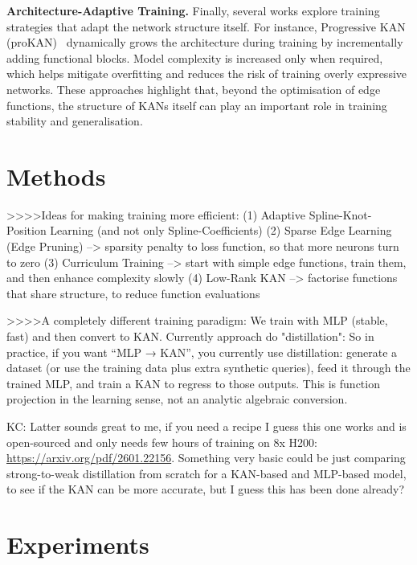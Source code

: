 \documentclass{article}
\begin{document}
\textbf{Architecture-Adaptive Training.}
Finally, several works explore training strategies that adapt the network structure itself.
For instance, Progressive KAN (proKAN)~\cite{gyanchandani2024prokan} dynamically grows the architecture during training by incrementally adding functional blocks.
Model complexity is increased only when required, which helps mitigate overfitting and reduces the risk of training overly expressive networks.
These approaches highlight that, beyond the optimisation of edge functions, the structure of KANs itself can play an important role in training stability and generalisation.
        
\newpage
\fi

\section{Methods}

>>>>Ideas for making training more efficient:
(1) Adaptive Spline-Knot-Position Learning (and not only Spline-Coefficients)
(2) Sparse Edge Learning (Edge Pruning) --> sparsity penalty to loss function, so that more neurons turn to zero
(3) Curriculum Training --> start with simple edge functions, train them, and then enhance complexity slowly
(4) Low-Rank KAN --> factorise functions that share structure, to reduce function evaluations

>>>>A completely different training paradigm:
We train with MLP (stable, fast) and then convert to KAN.
Currently approach do "distillation": So in practice, if you want “MLP → KAN”, you currently use distillation: generate a dataset (or use the training data plus extra synthetic queries), feed it through the trained MLP, and train a KAN to regress to those outputs. This is function projection in the learning sense, not an analytic algebraic conversion.

{\color{cyan}KC: Latter sounds great to me, if you need a recipe I guess this one works and is open-sourced and only needs few hours of training on 8x H200: \url{https://arxiv.org/pdf/2601.22156}. Something very basic could be just comparing strong-to-weak distillation from scratch for a KAN-based and MLP-based model, to see if the KAN can be more accurate, but I guess this has been done already?}

\section{Experiments}
\end{document}
